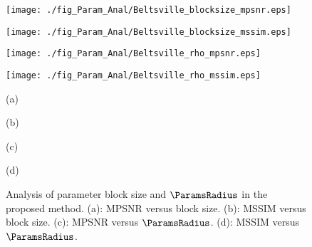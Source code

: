 \begin{figure*}[t]
\begin{center}
        
		\begin{minipage}{0.240\hsize}
		    	\centerline{\texttt{[image: ./fig\_Param\_Anal/Beltsville\_blocksize\_mpsnr.eps]}}
		\end{minipage}
		\begin{minipage}{0.240\hsize}
		    	\centerline{\texttt{[image: ./fig\_Param\_Anal/Beltsville\_blocksize\_mssim.eps]}}
		\end{minipage}
		\begin{minipage}{0.240\hsize}
		    	\centerline{\texttt{[image: ./fig\_Param\_Anal/Beltsville\_rho\_mpsnr.eps]}}
		\end{minipage}
		\begin{minipage}{0.240\hsize}
		    	\centerline{\texttt{[image: ./fig\_Param\_Anal/Beltsville\_rho\_mssim.eps]}}
		\end{minipage}


        \begin{minipage}{0.005\hsize}
        	\centerline{\hspace{\hsize}} %
        \end{minipage}
        \begin{minipage}{0.240\hsize}
            \centerline{\small{(a)}}
		\end{minipage}
		\begin{minipage}{0.240\hsize}
			\centerline{\small{(b)}}
		\end{minipage}
		\begin{minipage}{0.240\hsize}
			\centerline{\small{(c)}}
		\end{minipage}
		\begin{minipage}{0.240\hsize}
			\centerline{\small{(d)}}
		\end{minipage}
    \end{center}
	
    \vspace{-3mm}
    \caption{Analysis of parameter block size and $\ParamsRadius$ in the proposed method. (a): MPSNR versus block size. (b): MSSIM versus block size. (c): MPSNR versus $\ParamsRadius$. (d): MSSIM versus $\ParamsRadius$. }
    \label{fig:Param_Anal}
\end{figure*}